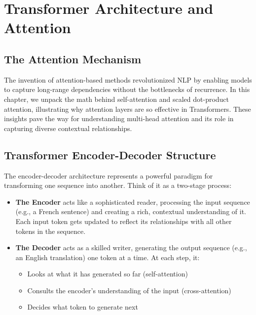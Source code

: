\documentclass[12pt]{book}
\begin{document}






\part{Transformer Architecture and Attention}

\chapter{The Attention Mechanism}
\noindent
The invention of attention-based methods revolutionized NLP by enabling models to capture long-range dependencies without the bottlenecks of recurrence. In this chapter, we unpack the math behind self-attention and scaled dot-product attention, illustrating why attention layers are so effective in Transformers. These insights pave the way for understanding multi-head attention and its role in capturing diverse contextual relationships.






\chapter{Transformer Encoder-Decoder Structure}
\label{chap:transformer_structure}

\noindent
The encoder-decoder architecture represents a powerful paradigm for transforming one sequence into another. Think of it as a two-stage process:

\begin{itemize}
    \item \textbf{The Encoder} acts like a sophisticated reader, processing the input sequence (e.g., a French sentence) and creating a rich, contextual understanding of it. Each input token gets updated to reflect its relationships with all other tokens in the sequence.
    
    \item \textbf{The Decoder} acts as a skilled writer, generating the output sequence (e.g., an English translation) one token at a time. At each step, it:
    \begin{itemize}
        \item Looks at what it has generated so far (self-attention)
        \item Consults the encoder's understanding of the input (cross-attention)
        \item Decides what token to generate next
    \end{itemize}
\end{itemize}
\end{document}
